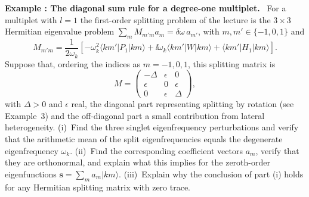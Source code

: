 \documentclass[a4paper,12pt]{paper}
\newcounter{example}
\renewenvironment{example}[1]{%
  \refstepcounter{example}%
  \begin{mdframed}[linewidth=1pt,innertopmargin=6pt,innerbottommargin=6pt]%
  \noindent\textbf{Example \theexample: #1.}\ }{%
  \end{mdframed}}
\begin{document}
\begin{example}{The diagonal sum rule for a degree-one multiplet}
For a multiplet with $l=1$ the first-order splitting problem of the lecture is the
$3\times3$ Hermitian eigenvalue problem $\sum_{m}M_{m'm}a_{m}=\delta\omega\,a_{m'}$, with
$m,m'\in\{-1,0,1\}$ and
\begin{equation*}
M_{m'm}=\frac{1}{2\omega_{k}}\left[-\omega_{k}^{2}\langle km'|P_{1}|km\rangle
+\ii\omega_{k}\langle km'|W|km\rangle+\langle km'|H_{1}|km\rangle\right].
\end{equation*}
Suppose that, ordering the indices as $m=-1,0,1$, this splitting matrix is
\begin{equation*}
M=\begin{pmatrix}-\Delta&\epsilon&0\\ \epsilon&0&\epsilon\\ 0&\epsilon&\Delta\end{pmatrix},
\end{equation*}
with $\Delta>0$ and $\epsilon$ real, the diagonal part representing splitting by rotation
(see Example~3) and the off-diagonal part a small contribution from lateral heterogeneity.
(i)~Find the three singlet eigenfrequency perturbations and verify that the arithmetic mean
of the split eigenfrequencies equals the degenerate eigenfrequency $\omega_{k}$. (ii)~Find
the corresponding coefficient vectors $a_{m}$, verify that they are orthonormal, and explain
what this implies for the zeroth-order eigenfunctions $\mathbf{s}=\sum_{m}a_{m}|km\rangle$.
(iii)~Explain why the conclusion of part (i) holds for any Hermitian splitting matrix with
zero trace.
\end{example}
\end{document}
